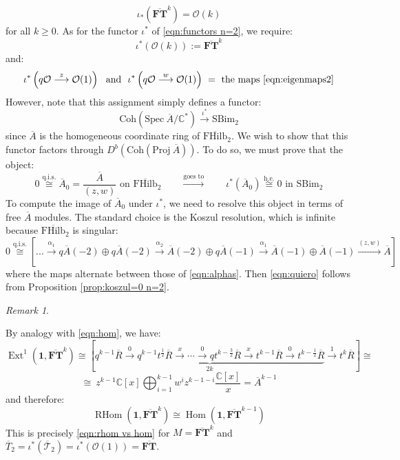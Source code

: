 \documentclass[12pt]{amsart}
\numberwithin{equation}{section}
\theoremstyle{definition}
\theoremstyle{remark}
\newtheorem{remark}[theorem]{Remark}
\DeclareMathOperator{\Hom}{Hom}
\DeclareMathOperator{\Ext}{Ext}
\DeclareMathOperator{\RHom}{{RHom}}
\newcommand{\CC}{\mathbb{C}}
\newcommand{\CO}{\mathcal{O}}
\newcommand{\CT}{\mathcal{T}}
\newcommand{\bFT}{\overline{\FT}}
\newcommand{\FT}{\mathbf{FT}}
\renewcommand{\1}{\mathbf{1}}
\newcommand{\coh}{\mathrm{Coh}}
\newcommand{\FH}{\mathrm{FHilb}}
\newcommand{\he}{\mathrm{h.e.}}
\newcommand{\qis}{\mathrm{q.i.s.}}
\newcommand{\spec}{\mathrm{Spec}}
\newcommand{\proj}{\mathrm{Proj}}
\newcommand{\SBim}{\mathrm{SBim}}
\newcommand{\bA}{\overline{A}}
\newcommand{\bFH}{\overline{\FH}}
\newcommand{\bCT}{\overline{\CT}}
\newcommand{\Rred}{\overline{R}}
\renewcommand{\he}{\text{h.e.}}
\begin{document}
$$
\iota_*(\bFT^k) = \CO(k)
$$
for all $k\geq 0$. As for the functor $\iota^*$ of \eqref{eqn:functors n=2}, we require:
$$
\iota^*(\CO(k)) := \bFT^k
$$
and:
$$
\iota^* \left(q\CO \stackrel{z}\longrightarrow \CO(1) \right) \ \text{ and } \ \iota^* \left(q\CO \stackrel{w}\longrightarrow \CO(1) \right) \  = \text{ the maps \eqref{eqn:eigenmaps2}}
$$
However, note that this assignment simply defines a functor:
$$
\coh \left( \spec \ \bA / \CC^* \right) \xrightarrow{\iota^*} \SBim_2
$$
since $\bA$ is the homogeneous coordinate ring of $\bFH_2$. We wish to show that this functor factors through $D^b(\coh (\proj \ \bA )) $. To do so, we must prove that the object: 
\begin{equation}
\label{eqn:quiero}
0 \stackrel{\qis}\cong \bA_0 = \frac {\bA}{(z,w)} \text{ on } \bFH_2 \qquad \xrightarrow{\text{goes to}} \qquad \iota^*(\bA_0) \stackrel{\he}\cong 0 \text{ in } \SBim_2
\end{equation}
To compute the image of $\bA_0$ under $\iota^*$, we need to resolve this object in terms of free $\bA$ modules. The standard choice is the Koszul resolution, which is infinite because $\bFH_2$ is singular:
$$
0 \stackrel{\qis}\cong \left[ ... \xrightarrow{\alpha_1} q\bA(-2) \oplus q\bA(-2) \xrightarrow{\alpha_2}  \bA(-2) \oplus q\bA(-1) \xrightarrow{\alpha_1}\bA(-1) \oplus \bA(-1) \xrightarrow{(z,w)} \bA \right]
$$
where the maps alternate between those of \eqref{eqn:alphas}. Then \eqref{eqn:quiero} follows from Proposition \ref{prop:koszul=0 n=2}. 

\begin{remark}
\label{rem:a grading n=2}

By analogy with \eqref{eqn:hom}, we have:
$$
\Ext^1(\1,\bFT^{k}) \cong \left[\underbrace{q^{k-1} \Rred \stackrel{0}\rightarrow q^{k-1} t^{\frac 12} \Rred \xrightarrow{x} \cdots \stackrel{0}\rightarrow q t^{k-\frac 32} \Rred \xrightarrow{x}  t^{k-1} \Rred \stackrel{0}\rightarrow t^{k-\frac 12} \Rred}_{2k} \stackrel{1}\rightarrow t^k \Rred \right] \cong %
$$
\begin{equation}
\cong \ z^{k-1} \CC[x] \bigoplus_{i=1}^{k-1} w^{i} z^{k-1-i} \frac {\CC[x]}x = \bA^{k-1}
\end{equation}
and therefore:
$$
\RHom \left(\1,\bFT^k \right) \cong \Hom\left(\1,\bFT^{k-1} \right)
$$
This is precisely \eqref{eqn:rhom vs hom} for $M = \bFT^k$ and $\overline{T}_2 = \iota^*(\bCT_2) = \iota^*(\CO(1)) = \bFT$.

\end{remark}
\end{document}
